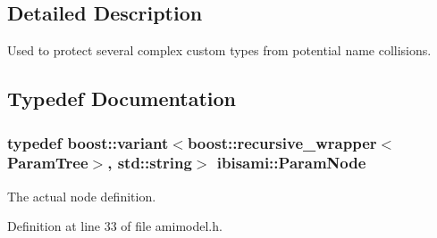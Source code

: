\subsection{Detailed Description}
Used to protect several complex custom types from potential name collisions. 

\subsection{Typedef Documentation}
\hypertarget{namespaceibisami_a56481565abb44593a678738f57c04109}{}
\subsubsection[{Param\+Node}]{\setlength{\rightskip}{0pt plus 5cm}typedef boost\+::variant$<$boost\+::recursive\+\_\+wrapper$<${\bf Param\+Tree}$>$, std\+::string$>$ {\bf ibisami\+::\+Param\+Node}}\label{namespaceibisami_a56481565abb44593a678738f57c04109}
The actual node definition. 

Definition at line 33 of file amimodel.\+h.

